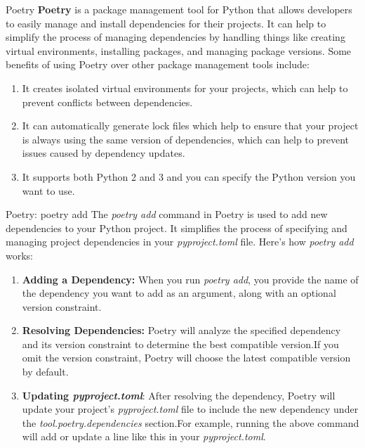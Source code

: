 \begin{frame}
    \begin{content}{Poetry}
        \textbf{Poetry} is a package management tool for Python that allows developers to easily manage and install dependencies for their projects. It can help to simplify the process of managing dependencies by handling things like creating virtual environments, installing packages, and managing package versions. Some benefits of using Poetry over other package management tools include:
        \begin{enumerate}
            \item It creates isolated virtual environments for your projects, which can help to prevent conflicts between dependencies.
            \item It can automatically generate lock files which help to ensure that your project is always using the same version of dependencies, which can help to prevent issues caused by dependency updates.
            \item It supports both Python 2 and 3 and you can specify the Python version you want to use.
        \end{enumerate}
    \end{content}
\end{frame}

\begin{frame}
    \begin{content}{Poetry: poetry add}
        The \textit{poetry add} command in Poetry is used to add new dependencies to your Python project. It simplifies the process of specifying and managing project dependencies in your \textit{pyproject.toml} file. Here's how \textit{poetry add} works:
        \begin{enumerate}
            \item \textbf{Adding a Dependency:} When you run \textit{poetry add}, you provide the name of the dependency you want to add as an argument, along with an optional version constraint.
            \item \textbf{Resolving Dependencies:} Poetry will analyze the specified dependency and its version constraint to determine the best compatible version.If you omit the version constraint, Poetry will choose the latest compatible version by default.
            \item \textbf{Updating \textit{pyproject.toml}}: After resolving the dependency, Poetry will update your project's \textit{pyproject.toml} file to include the new dependency under the \textit{tool.poetry.dependencies} section.For example, running the above command will add or update a line like this in your \textit{pyproject.toml}.
        \end{enumerate}
    \end{content}
\end{frame}

